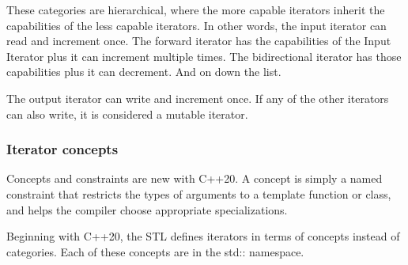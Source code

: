 These categories are hierarchical, where the more capable iterators inherit the capabilities of the less capable iterators. In other words, the input iterator can read and increment once. The forward iterator has the capabilities of the Input Iterator plus it can increment multiple times. The bidirectional iterator has those capabilities plus it can decrement. And on down the list.

The output iterator can write and increment once. If any of the other iterators can also write, it is considered a mutable iterator.

\subsubsection{Iterator concepts}

Concepts and constraints are new with C++20. A concept is simply a named constraint that restricts the types of arguments to a template function or class, and helps the compiler choose appropriate specializations.

Beginning with C++20, the STL defines iterators in terms of concepts instead of categories. Each of these concepts are in the std:: namespace.

